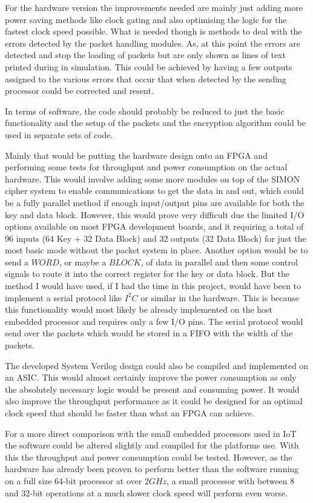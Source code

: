 \documentclass[12pt,twoside,a4paper]{report}
\begin{document}
	For the hardware version the improvements needed are mainly just adding more power saving methods like clock gating and also optimising the logic for the fastest clock speed possible. What is needed though is methods to deal with the errors detected by the packet handling modules. As, at this point the errors are detected and stop the loading of packets but are only shown as lines of text printed during in simulation. This could be achieved by having a few outputs assigned to the various errors that occur that when detected by the sending processor could be corrected and resent.
	
	In terms of software, the code should probably be reduced to just the basic functionality and the setup of the packets and the encryption algorithm could be used in separate sets of code. 
	
	Mainly that would be putting the hardware design onto an FPGA and performing some tests for throughput and power consumption on the actual hardware. This would involve adding some more modules on top of the SIMON cipher system to enable communications to get the data in and out, which could be a fully parallel method if enough input/output pins are available for both the key and data block. However, this would prove very difficult due the limited I/O options available on most FPGA development boards, and it requiring a total of 96 inputs (64 Key + 32 Data Block) and 32 outputs (32 Data Block) for just the most basic mode without the packet system in place. Another option would be to send a $WORD$, or maybe a $BLOCK$, of data in parallel and then some control signals to route it into the correct register for the key or data block. But the method I would have used, if I had the time in this project, would have been to implement a serial protocol like $I^2C$ or similar in the hardware. This is because this functionality would most likely be already implemented on the host embedded processor and requires only a few I/O pins. The serial protocol would send over the packets which would be stored in a FIFO with the width of the packets.
	
	The developed System Verilog design could also be compiled and implemented on an ASIC. This would almost certainly improve the power consumption as only the absolutely necessary  logic would be present and consuming power. It would also improve the throughput performance as it could be designed for an optimal clock speed that should be faster than what an FPGA can achieve.
	
	For a more direct comparison with the small embedded processors used in IoT the software could be altered slightly and compiled for the platforms use. With this the throughput and power consumption could be tested. However, as the hardware has already been proven to perform better than the software running on a full size 64-bit processor at over $2GHz$, a small processor with between 8 and 32-bit operations at a much slower clock speed will perform even worse.
	
\end{document}
